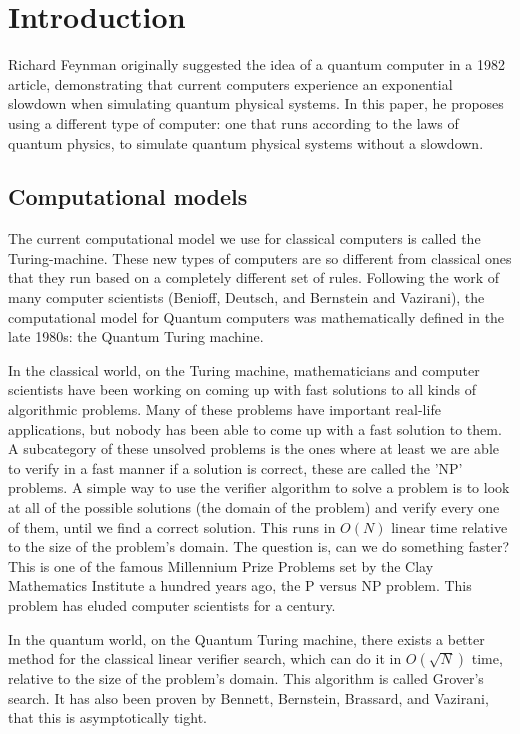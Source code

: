 \chapter{Introduction}

Richard Feynman originally suggested the idea of a quantum computer in a 1982 article\cite{feynman_simulating_1982}, demonstrating that current computers experience an exponential slowdown when simulating quantum physical systems. In this paper, he proposes using a different type of computer: one that runs according to the laws of quantum physics, to simulate quantum physical systems without a slowdown.\cite{Hirvensalo}

\section{Computational models}

The current computational model we use for classical computers is called the Turing-machine. These new types of computers are so different from classical ones that they run based on a completely different set of rules. Following the work of many computer scientists (Benioff\cite{benioff_models_1998}, Deutsch\cite{deutsch_quantum_1985}, and Bernstein and Vazirani\cite{bernstein_quantum_1993}), the computational model for Quantum computers was mathematically defined in the late 1980s: the Quantum Turing machine.

In the classical world, on the Turing machine, mathematicians and computer scientists have been working on coming up with fast solutions to all kinds of algorithmic problems. Many of these problems have important real-life applications, but nobody has been able to come up with a fast solution to them. A subcategory of these unsolved problems is the ones where at least we are able to verify in a fast manner if a solution is correct, these are called the 'NP' problems. A simple way to use the verifier algorithm to solve a problem is to look at all of the possible solutions (the domain of the problem) and verify every one of them, until we find a correct solution. This runs in $O(N)$ linear time relative to the size of the problem's domain. The question is, can we do something faster? This is one of the famous Millennium Prize Problems set by the Clay Mathematics Institute a hundred years ago, the P versus NP problem. This problem has eluded computer scientists for a century.

In the quantum world, on the Quantum Turing machine, there exists a better method for the classical linear verifier search, which can do it in $O(\sqrt{N})$ time, relative to the size of the problem's domain. This algorithm is called Grover's search. It has also been proven by Bennett, Bernstein, Brassard, and Vazirani, that this is asymptotically tight\cite{bennett_strengths_1997}.

